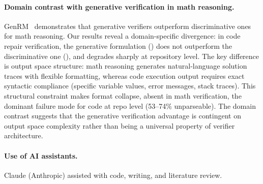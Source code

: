 \paragraph{Domain contrast with generative verification in math reasoning.}
GenRM~\cite{hosseini2025genrm} demonstrates that generative verifiers outperform discriminative ones for math reasoning. Our results reveal a domain-specific divergence: in code repair verification, the generative formulation (\cwm{}) does not outperform the discriminative one (\cls{}), and degrades sharply at repository level. The key difference is output space structure: math reasoning generates natural-language solution traces with flexible formatting, whereas code execution output requires exact syntactic compliance (specific variable values, error messages, stack traces). This structural constraint makes format collapse, absent in math verification, the dominant failure mode for code \cwm{} at repo level (53--74\% unparseable). The domain contrast suggests that the generative verification advantage is contingent on output space complexity rather than being a universal property of verifier architecture.

\paragraph{Use of AI assistants.}
\label{app:ai-assistants}
Claude (Anthropic) assisted with code, writing, and literature review.
